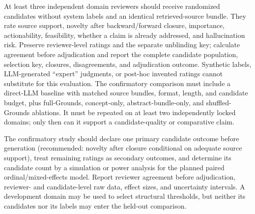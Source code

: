 \documentclass[runningheads]{llncs}
\begin{document}
At least three independent domain reviewers should receive randomized candidates without system labels and an identical retrieved-source bundle. They rate source support, novelty after backward/forward closure, importance, actionability, feasibility, whether a claim is already addressed, and hallucination risk. Preserve reviewer-level ratings and the separate unblinding key; calculate agreement before adjudication and report the complete candidate population, selection key, closures, disagreements, and adjudication outcome. Synthetic labels, LLM-generated ``expert'' judgments, or post-hoc invented ratings cannot substitute for this evaluation. The confirmatory comparison must include a direct-LLM baseline with matched source bundles, format, length, and candidate budget, plus full-Grounds, concept-only, abstract-bundle-only, and shuffled-Grounds ablations. It must be repeated on at least two independently locked domains; only then can it support a candidate-quality or comparative claim.

The confirmatory study should declare one primary candidate outcome before generation (recommended: novelty after closure conditional on adequate source support), treat remaining ratings as secondary outcomes, and determine its candidate count by a simulation or power analysis for the planned paired ordinal/mixed-effects model. Report reviewer agreement before adjudication, reviewer- and candidate-level raw data, effect sizes, and uncertainty intervals. A development domain may be used to select structural thresholds, but neither its candidates nor its labels may enter the held-out comparison.
\end{document}
